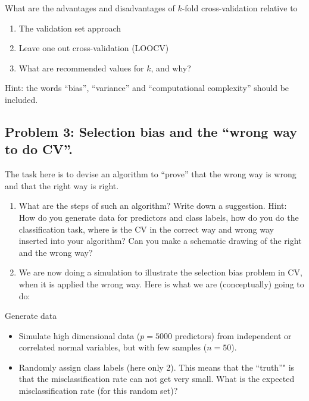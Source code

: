 \documentclass[]{article}
\providecommand{\tightlist}{%
  \setlength{\itemsep}{0pt}\setlength{\parskip}{0pt}}
\begin{document}
What are the advantages and disadvantages of \(k\)-fold cross-validation
relative to

\begin{enumerate}
\def\labelenumi{\alph{enumi})}
\tightlist
\item
  The validation set approach
\item
  Leave one out cross-validation (LOOCV)
\item
  What are recommended values for \(k\), and why?
\end{enumerate}

Hint: the words ``bias'', ``variance'' and ``computational complexity''
should be included.

\hypertarget{problem-3-selection-bias-and-the-wrong-way-to-do-cv.}{%
\subsection{Problem 3: Selection bias and the ``wrong way to do
CV''.}\label{problem-3-selection-bias-and-the-wrong-way-to-do-cv.}}

The task here is to devise an algorithm to ``prove'' that the wrong way
is wrong and that the right way is right.

\begin{enumerate}
\def\labelenumi{\alph{enumi})}
\item
  What are the steps of such an algorithm? Write down a suggestion.
  Hint: How do you generate data for predictors and class labels, how do
  you do the classification task, where is the CV in the correct way and
  wrong way inserted into your algorithm? Can you make a schematic
  drawing of the right and the wrong way?
\item
  We are now doing a simulation to illustrate the selection bias problem
  in CV, when it is applied the wrong way. Here is what we are
  (conceptually) going to do:
\end{enumerate}

Generate data

\begin{itemize}
\item
  Simulate high dimensional data (\(p=5000\) predictors) from
  independent or correlated normal variables, but with few samples
  (\(n=50\)).
\item
  Randomly assign class labels (here only 2). This means that the
  ``truth''" is that the misclassification rate can not get very small.
  What is the expected misclassification rate (for this random set)?
\end{itemize}
\end{document}
